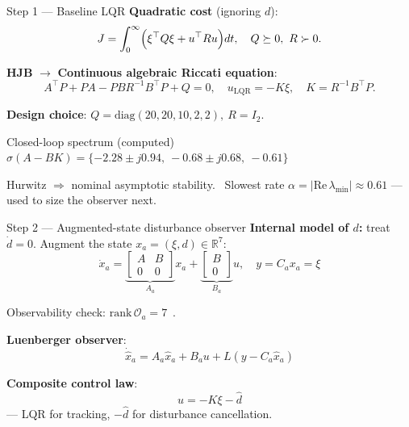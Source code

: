 \documentclass[10pt,aspectratio=169]{beamer}
\newcommand{\R}{\mathbb{R}}
\begin{document}
\begin{frame}{Step 1 — Baseline LQR}
  \textbf{Quadratic cost} (ignoring $d$):
  \begin{equation*}
    J=\int_0^\infty\Bigl(\xi^\top Q\xi+u^\top Ru\Bigr)dt,\quad
    Q\succeq 0,\ R\succ 0.
  \end{equation*}

  \textbf{HJB} $\rightarrow$ \textbf{Continuous algebraic Riccati equation}:
  \begin{equation*}
    A^\top P+PA-PBR^{-1}B^\top P+Q=0,
    \quad u_{\mathrm{LQR}}=-K\xi,\quad K=R^{-1}B^\top P.
  \end{equation*}

  \vspace{0.4em}
  \textbf{Design choice}: $Q=\mathrm{diag}(20,20,10,2,2),\ R=I_2$.

  \vspace{0.3em}
  \begin{block}{Closed-loop spectrum (computed)}
    \centering
    $\sigma(A-BK)=\{-2.28\!\pm\!j0.94,\ -0.68\!\pm\!j0.68,\ -0.61\}$
  \end{block}

  \vspace{0.2em}
  \alert{Hurwitz} $\Rightarrow$ nominal asymptotic stability. \
  Slowest rate
  $\alpha\!=\!|\mathrm{Re}\,\lambda_{\min}|\!\approx\!0.61$ — used to size
  the observer next.
\end{frame}

\begin{frame}{Step 2 — Augmented-state disturbance observer}
  \textbf{Internal model of $d$:} treat $\dot d=0$. Augment the state
  $x_a=(\xi,d)\in\R^7$:
  \begin{equation*}
    \dot x_a=\underbrace{\begin{bmatrix}A & B\\ 0 & 0\end{bmatrix}}_{A_a}
              x_a +
              \underbrace{\begin{bmatrix}B\\0\end{bmatrix}}_{B_a}u,
    \quad y=C_a x_a=\xi
  \end{equation*}

  Observability check: $\mathrm{rank}\,\mathcal{O}_a=7$\ \checkmark.

  \vspace{0.5em}
  \textbf{Luenberger observer}:
  \begin{equation*}
    \dot{\hat x}_a=A_a\hat x_a+B_a u+L(y-C_a\hat x_a)
  \end{equation*}

  \textbf{Composite control law}:
  \begin{equation*}
    \boxed{u=-K\xi-\hat d}
  \end{equation*}
  — LQR for tracking, $-\hat d$ for disturbance cancellation.
\end{frame}
\end{document}
